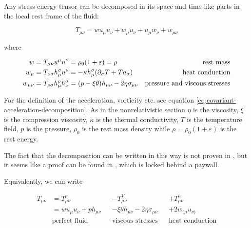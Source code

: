 \documentclass[main.tex]{subfiles}
\begin{document}
Any stress-energy tensor can be decomposed in its space and time-like parts in the local rest frame of the fluid:

\begin{equation} \label{eq:stress-energy-tensor-decomposition}
    T_{\mu \nu} = w u_\mu u_\nu + w_\mu u_\nu + u_\mu w_\nu + w _{\mu \nu}
\end{equation}

where

\begin{subequations} \label{eq:components-stress-energy-tensor}
\begin{align}
  w &=  T _{\mu \nu} u^\mu u^\nu = \rho_0 (1 + \varepsilon) = \rho & \text{rest mass} \\
  w_\mu &= T _{\nu \sigma} h^\sigma _\mu u^\nu  = -\kappa h_\mu ^\sigma  \qty(\partial_\sigma T + T a_\sigma) & \text{heat conduction} \\
  w_{\mu \nu} &= T_{\rho \sigma} h^\rho _\mu h^\sigma_\nu = \qty(p - \xi \theta) h_{\mu \nu} - 2 \eta \sigma_{\mu \nu}  & \text{pressure and viscous stresses}
\end{align}
\end{subequations}

For the definition of the acceleration, vorticity etc. see equation \eqref{eq:covariant-acceleration-decomposition}.
As in the nonrelativistic section \(\eta\) is the viscosity, \(\xi\) is the compression viscosity,  \(\kappa\) is the thermal conductivity, \(T\) is the temperature field, \(p\) is the pressure, \(\rho_0\) is the rest mass density while \(\rho = \rho_0 (1 + \varepsilon)\) is the rest energy.

\begin{greenbox}
    The fact that the decomposition can be written in this way is not proven in \cite[]{Taub:1978}, but it seems like a proof can be found in \cite[]{Eckart:1940}, which is locked behind a paywall.
\end{greenbox}

Equivalently, we can write

\begin{subequations} \label{eq:stress-energy-tensor-decomposition-2}
\begin{align}
  T_{\mu\nu} &= T_{\mu\nu}^p && - T_{\mu\nu}^V &&+ T_{\mu\nu}^h  \\
  &= w u_\mu u_\nu + p h_{\mu\nu} &&-\xi \theta h_{\mu\nu} - 2 \eta \sigma_{\mu\nu} &&+2w_{(\mu} u_{\nu)}  \\
  &\text{perfect fluid} && \text{viscous stresses} && \text{heat conduction}
\end{align}
\end{subequations}
\end{document}
